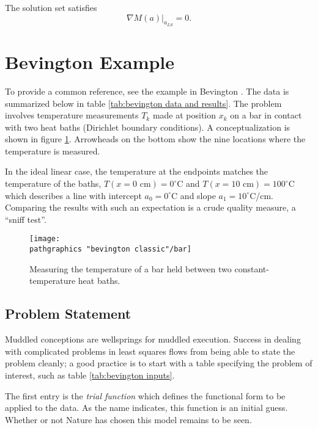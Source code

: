 The solution set satisfies
  \begin{equation}   %
    \nabla M( a )|_{a_{LS}} = 0 .
    \label{eq:gradient lr}
  \end{equation}

\section{Bevington Example}  %

To provide a common reference, see the example in Bevington \cite[ch 6]{Bevington}. The data is summarized below in table \ref{tab:bevington data and results}. The problem involves temperature measurements $T_{k}$ made at position $x_{k}$ on a bar in contact with two heat baths (Dirichlet boundary conditions). A conceptualization is shown in figure \ref{fig:bar}. Arrowheads on the bottom show the nine locations where the temperature is measured.

In the ideal linear case, the temperature at the endpoints matches the temperature of the baths, $T(x=0 \text{ cm}) = 0^{\circ}$C and $T(x = 10 \text{ cm}) = 100^{\circ}$C which describes a line with intercept $a_{0} = 0^{\circ}$C and slope $a_{1} = 10^{\circ}$C/cm. Comparing the results with such an expectation is a crude quality measure, a ``sniff test''.

\begin{figure}[htbp] %
   \centering
   \texttt{[image: \\pathgraphics "bevington classic"/bar]} 
   \caption[Measuring the temperature of a bar.]{Measuring the temperature of a bar held between two constant-temperature heat baths.}
   \label{fig:bar}
\end{figure}

\subsection{Problem Statement}  %
Muddled conceptions are wellsprings for muddled execution. Success in dealing with complicated problems in least squares flows from being able to state the problem cleanly; a good practice is to start with a table specifying the problem of interest, such as table \ref{tab:bevington inputs}.

The first entry is the \emph{trial function} which defines the functional form to be applied to the data. As the name indicates, this function is an initial guess. Whether or not Nature has chosen this model remains to be seen.

